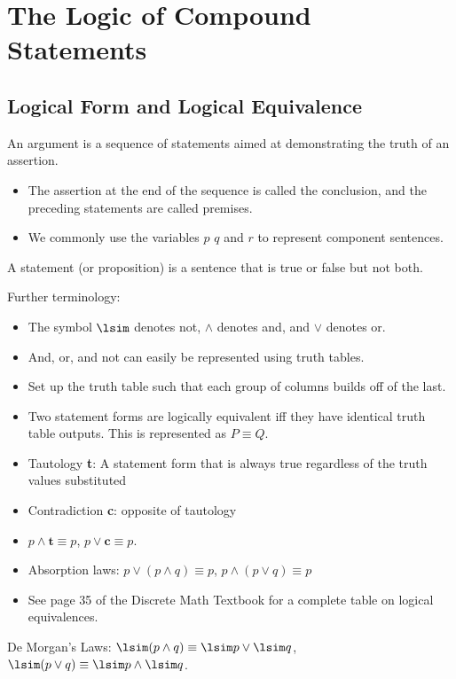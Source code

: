 \documentclass[a4paper]{report}
\begin{document}
\chapter{The Logic of Compound Statements}

\section{Logical Form and Logical Equivalence}

An argument is a sequence of statements aimed at demonstrating the truth of an assertion.

\begin{itemize}
    \item The assertion at the end of the sequence is called the conclusion, and the preceding statements are called premises.
    \item We commonly use the variables $p$ $q$ and $r$ to represent component sentences.
\end{itemize}

A statement (or proposition) is a sentence that is true or false but not both.

Further terminology:

\begin{itemize}
    \item The symbol $\lsim$ denotes not, $\land$ denotes and, and  $\lor$ denotes or.
    \item And, or, and not can easily be represented using truth tables.
    \item Set up the truth table such that each group of columns builds off of the last.
    \item Two statement forms are logically equivalent iff they have identical truth table outputs. This is represented as $P \equiv Q$.
    \item Tautology \textbf{t}: A statement form that is always true regardless of the truth values substituted
    \item Contradiction \textbf{c}: opposite of tautology
    \item $p \land \textbf{t} \equiv p$,  $p \lor \textbf{c} \equiv p$.
    \item Absorption laws: $p \lor (p \land q) \equiv p$, $p \land (p \lor q) \equiv p$
    \item See page 35 of the Discrete Math Textbook for a complete table on logical equivalences.
\end{itemize}

De Morgan's Laws: $\lsim(p \land q) \equiv \lsim p \lor \lsim q$,  $\lsim (p \lor q) \equiv \lsim p \land \lsim q$.
\end{document}
